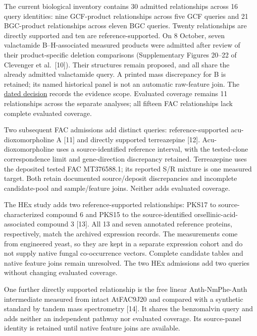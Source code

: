 \documentclass[
  10pt,
  a4paper,
]{article}
\begin{document}
The current biological inventory contains 30 admitted relationships across 16 query identities: nine GCF-product relationships across five GCF queries and 21 BGC-product relationships across eleven BGC queries. Twenty relationships are directly supported and ten are reference-supported. On 8 October, seven valactamide B--H-associated measured products were admitted after review of their product-specific deletion comparisons (Supplementary Figures 20--22 of Clevenger et al.~{[}10{]}). Their structures remain proposed, and all share the already admitted valactamide query. A printed mass discrepancy for B is retained; its named historical panel is not an automatic raw-feature join. The \href{https://github.com/vinvomero/fungallink-benchmark/blob/main/protocol/decisions/2026-10-08-valactamide-congener-admissions.md}{dated decision} records the evidence scope. Evaluated coverage remains 11 relationships across the separate analyses; all fifteen FAC relationships lack complete evaluated coverage.

Two subsequent FAC admissions add distinct queries: reference-supported acu-dioxomorpholine A {[}11{]} and directly supported terreazepine {[}12{]}. Acu-dioxomorpholine uses a source-identified reference interval, with the tested-clone correspondence limit and gene-direction discrepancy retained. Terreazepine uses the deposited tested FAC MT376588.1; its reported S/R mixture is one measured target. Both retain documented source/deposit discrepancies and incomplete candidate-pool and sample/feature joins. Neither adds evaluated coverage.

The HEx study adds two reference-supported relationships: PKS17 to source-characterized compound 6 and PKS15 to the source-identified orsellinic-acid-associated compound 3 {[}13{]}. All 13 and seven annotated reference proteins, respectively, match the archived expression records. The measurements come from engineered yeast, so they are kept in a separate expression cohort and do not supply native fungal co-occurrence vectors. Complete candidate tables and native feature joins remain unresolved. The two HEx admissions add two queries without changing evaluated coverage.

One further directly supported relationship is the free linear Anth-NmPhe-Anth intermediate measured from intact AtFAC9J20 and compared with a synthetic standard by tandem mass spectrometry {[}14{]}. It shares the benzomalvin query and adds neither an independent pathway nor evaluated coverage. Its source-panel identity is retained until native feature joins are available.
\end{document}
